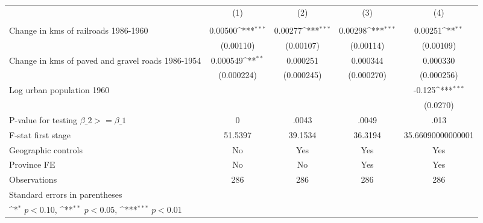 {
\def\sym#1{\ifmmode^{#1}\else\(^{#1}\)\fi}
\begin{tabular}{l*{4}{c}}
\hline\hline
                &\multicolumn{1}{c}{(1)}&\multicolumn{1}{c}{(2)}&\multicolumn{1}{c}{(3)}&\multicolumn{1}{c}{(4)}\\
                &\multicolumn{1}{c}{}&\multicolumn{1}{c}{}&\multicolumn{1}{c}{}&\multicolumn{1}{c}{}\\
\hline
Change in kms of railroads 1986-1960&  0.00500\sym{***}&  0.00277\sym{***}&  0.00298\sym{***}&  0.00251\sym{**} \\
                &(0.00110)         &(0.00107)         &(0.00114)         &(0.00109)         \\
[1em]
Change in kms of paved and gravel roads 1986-1954& 0.000549\sym{**} & 0.000251         & 0.000344         & 0.000330         \\
                &(0.000224)         &(0.000245)         &(0.000270)         &(0.000256)         \\
[1em]
Log urban population 1960&                  &                  &                  &   -0.125\sym{***}\\
                &                  &                  &                  & (0.0270)         \\
\hline
P-value for testing $\beta\_{2} >= \beta\_{1}$&        0         &    .0043         &    .0049         &     .013         \\
F-stat first stage&  51.5397         &  39.1534         &  36.3194         &35.66090000000001         \\
Geographic controls&       No         &      Yes         &      Yes         &      Yes         \\
Province FE     &       No         &       No         &      Yes         &      Yes         \\
Observations    &      286         &      286         &      286         &      286         \\
\hline\hline
\multicolumn{5}{l}{\footnotesize Standard errors in parentheses}\\
\multicolumn{5}{l}{\footnotesize \sym{*} \(p<0.10\), \sym{**} \(p<0.05\), \sym{***} \(p<0.01\)}\\
\end{tabular}
}
